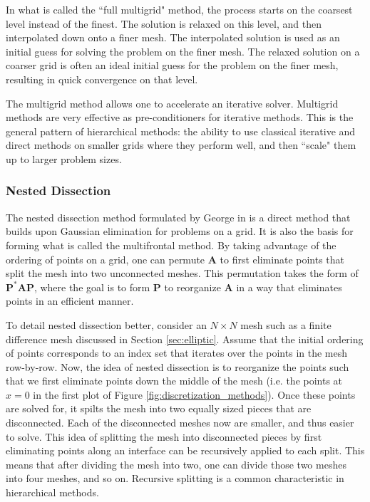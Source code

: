 In what is called the ``full multigrid" method, the process starts on the coarsest level instead of the finest. The solution is relaxed on this level, and then interpolated down onto a finer mesh. The interpolated solution is used as an initial guess for solving the problem on the finer mesh. The relaxed solution on a coarser grid is often an ideal initial guess for the problem on the finer mesh, resulting in quick convergence on that level.

The multigrid method allows one to accelerate an iterative solver. Multigrid methods are very effective as pre-conditioners for iterative methods. This is the general pattern of hierarchical methods: the ability to use classical iterative and direct methods on smaller grids where they perform well, and then ``scale" them up to larger problem sizes.

\subsubsection{Nested Dissection}
\label{subsub:nested-dissection}

The nested dissection method formulated by George in \cite{george1973nested} is a direct method that builds upon Gaussian elimination for problems on a grid. It is also the basis for forming what is called the multifrontal method. By taking advantage of the ordering of points on a grid, one can permute $\textbf{A}$ to first eliminate points that split the mesh into two unconnected meshes. This permutation takes the form of $\textbf{P}^* \textbf{A} \textbf{P}$, where the goal is to form $\textbf{P}$ to reorganize $\textbf{A}$ in a way that eliminates points in an efficient manner.

To detail nested dissection better, consider an $N \times N$ mesh such as a finite difference mesh discussed in Section \ref{sec:elliptic}. Assume that the initial ordering of points corresponds to an index set that iterates over the points in the mesh row-by-row. Now, the idea of nested dissection is to reorganize the points such that we first eliminate points down the middle of the mesh (i.e. the points at $x = 0$ in the first plot of Figure \ref{fig:discretization_methods}). Once these points are solved for, it spilts the mesh into two equally sized pieces that are disconnected. Each of the disconnected meshes now are smaller, and thus easier to solve. This idea of splitting the mesh into disconnected pieces by first eliminating points along an interface can be recursively applied to each split. This means that after dividing the mesh into two, one can divide those two meshes into four meshes, and so on. Recursive splitting is a common characteristic in hierarchical methods.

